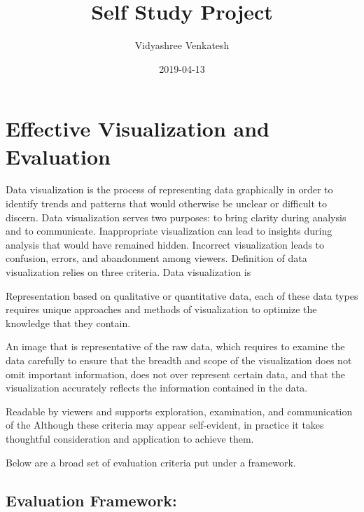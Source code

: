 \documentclass[]{book}
\title{Self Study Project}
\author{Vidyashree Venkatesh}
\date{2019-04-13}
\begin{document}
\maketitle

{
\setcounter{tocdepth}{1}
\tableofcontents
}
\hypertarget{effective-visualization-and-evaluation}{%
\chapter{Effective Visualization and Evaluation}\label{effective-visualization-and-evaluation}}

Data visualization is the process of representing data graphically in order to identify trends and patterns that would otherwise be unclear or difficult to discern. Data visualization serves two purposes: to bring clarity during analysis and to communicate. Inappropriate visualization can lead to insights during analysis that would have remained hidden. Incorrect visualization leads to confusion, errors, and abandonment among viewers.
Definition of data visualization relies on three criteria. Data visualization is

Representation based on qualitative or quantitative data, each of these data types requires unique approaches and methods of visualization to optimize the knowledge that they contain.

An image that is representative of the raw data, which requires to examine the data carefully to ensure that the breadth and scope of the visualization does not omit important information, does not over represent certain data, and that the visualization accurately reflects the information contained in the data.

Readable by viewers and supports exploration, examination, and communication of the
Although these criteria may appear self-evident, in practice it takes thoughtful consideration and application to achieve them.
\citep{visualization_eval}

Below are a broad set of evaluation criteria put under a framework.

\hypertarget{evaluation-framework}{%
\section{Evaluation Framework:}\label{evaluation-framework}}

\citep{Eval_Viz}
\end{document}
